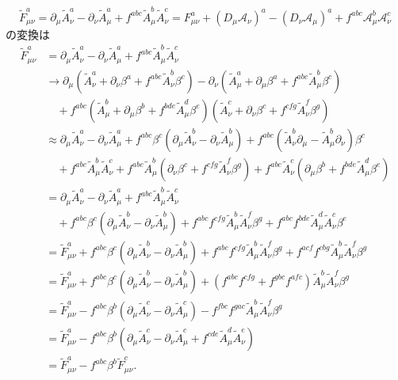 \[
\tilde{F}_{\mu\nu}^a = \partial_\mu \tilde{A}_\nu^a - \partial_\nu \tilde{A}_\mu^a + f^{abc}\tilde{A}_\mu^b \tilde{A}_\nu^c
= F_{\mu\nu}^a + (D_\mu \mathcal{A}_\nu)^a - (D_\nu \mathcal{A}_\mu)^a + f^{abc}\mathcal{A}_\mu^b\mathcal{A}_\nu^c
\]
の変換は
\begin{align*}
  \tilde{F}_{\mu\nu}^a &= \partial_\mu \tilde{A}_\nu^a - \partial_\nu \tilde{A}_\mu^a + f^{abc}\tilde{A}_\mu^b \tilde{A}_\nu^c \\
  &\to \partial_\mu (\tilde{A}_\nu^a + \partial_\nu\beta^a + f^{abc}\tilde{A}_\nu^b \beta^c)
  - \partial_\nu (\tilde{A}_\mu^a + \partial_\mu\beta^a + f^{abc}\tilde{A}_\mu^b \beta^c) \\
  &\quad + f^{abc} (\tilde{A}_\mu^b + \partial_\mu\beta^b + f^{bde}\tilde{A}_\mu^d \beta^e)
  (\tilde{A}_\nu^c + \partial_\nu\beta^c + f^{cfg}\tilde{A}_\nu^f \beta^g) \\
  &\approx \partial_\mu\tilde{A}_\nu^a - \partial_\nu\tilde{A}_\mu^a
  + f^{abc} \beta^c (\partial_\mu\tilde{A}_\nu^b - \partial_\nu\tilde{A}_\mu^b)
  + f^{abc} (\tilde{A}_\nu^b \partial_\mu - \tilde{A}_\mu^b\partial_\nu) \beta^c \\
  &\quad + f^{abc} \tilde{A}_\mu^b \tilde{A}_\nu^c
  + f^{abc} \tilde{A}_\mu^b (\partial_\nu\beta^c + f^{cfg}\tilde{A}_\nu^f \beta^g)
  + f^{abc} \tilde{A}_\nu^c (\partial_\mu\beta^b + f^{bde}\tilde{A}_\mu^d \beta^e) \\
  &= \partial_\mu\tilde{A}_\nu^a - \partial_\nu\tilde{A}_\mu^a
  + f^{abc} \tilde{A}_\mu^b \tilde{A}_\nu^c \\
  &\quad + f^{abc} \beta^c (\partial_\mu\tilde{A}_\nu^b - \partial_\nu\tilde{A}_\mu^b)
  + f^{abc}f^{cfg} \tilde{A}_\mu^b\tilde{A}_\nu^f \beta^g
  + f^{abc}f^{bde} \tilde{A}_\mu^d\tilde{A}_\nu^c \beta^e \\
  &= \tilde{F}_{\mu\nu}^a
  + f^{abc} \beta^c (\partial_\mu\tilde{A}_\nu^b - \partial_\nu\tilde{A}_\mu^b)
  + f^{abc}f^{cfg} \tilde{A}_\mu^b\tilde{A}_\nu^f \beta^g
  + f^{acf}f^{cbg} \tilde{A}_\mu^b\tilde{A}_\nu^f \beta^g \\
  &= \tilde{F}_{\mu\nu}^a
  + f^{abc} \beta^c (\partial_\mu\tilde{A}_\nu^b - \partial_\nu\tilde{A}_\mu^b)
  + (f^{abc}f^{cfg} + f^{gbc}f^{afc}) \tilde{A}_\mu^b\tilde{A}_\nu^f \beta^g \\
  &= \tilde{F}_{\mu\nu}^a
  - f^{abc} \beta^b (\partial_\mu\tilde{A}_\nu^c - \partial_\nu\tilde{A}_\mu^c)
  - f^{fbc}f^{gac} \tilde{A}_\mu^b\tilde{A}_\nu^f \beta^g \\
  &= \tilde{F}_{\mu\nu}^a
  - f^{abc} \beta^b (\partial_\mu\tilde{A}_\nu^c - \partial_\nu\tilde{A}_\mu^c + f^{cde} \tilde{A}_\mu^d\tilde{A}_\nu^e) \\
  &= \tilde{F}_{\mu\nu}^a - f^{abc} \beta^b \tilde{F}_{\mu\nu}^c .
\end{align*}

